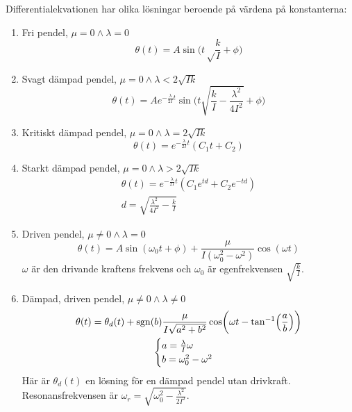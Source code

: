 \documentclass[12pt, a4paper]{article}
\DeclareMathOperator{\sgn}{sgn}
\begin{document}
Differentialekvationen har olika lösningar beroende på värdena på konstanterna:
\begin{enumerate}
    \item Fri pendel, $\mu=0\land\lambda=0$
    \begin{equation}\label{eq:fri_pendel}
        \theta(t)=A\sin\biggl(t\sqrt\frac{k}{I}+\phi\biggr)
    \end{equation}
    \item Svagt dämpad pendel, $\mu=0\land\lambda<2\sqrt{Ik}$
    \begin{equation}\label{eq:svagt_dämpad}
        \theta(t)=Ae^{-\frac{\lambda}{2I}t}\sin\biggl(t\sqrt{\frac{k}{I}-\frac{\lambda^2}{4I^2}}+\phi\biggr)
    \end{equation}
    \item Kritiskt dämpad pendel, $\mu=0\land\lambda=2\sqrt{Ik}$
    \begin{equation}
        \theta(t)=e^{-\frac{\lambda}{2I}t}\left(C_1t+C_2\right)
    \end{equation}
    \item Starkt dämpad pendel, $\mu=0\land\lambda>2\sqrt{Ik}$
    \begin{equation}\label{eq:starkt_dämpad}
        \begin{gathered}
            \theta(t)=e^{-\frac{\lambda}{2I}t}\left(C_1e^{td}+C_2e^{-td}\right)\\
            d=\sqrt{\frac{\lambda^2}{4I^2}-\frac{k}{I}}
        \end{gathered}
    \end{equation}
    \item Driven pendel, $\mu\neq0\land\lambda=0$
    \begin{equation}\label{eq:driven}
        \theta(t)=A\sin(\omega_0t+\phi)+\frac{\mu}{I(\omega_0^2-\omega^2)}\cos(\omega t)
    \end{equation}
    $\omega$ är den drivande kraftens frekvens och $\omega_0$ är egenfrekvensen $\sqrt{\frac{k}{I}}$.
    \item Dämpad, driven pendel, $\mu\neq0\land\lambda\neq0$
    \begin{equation}\label{eq:dämpad_driven}
        \begin{gathered}
            \theta(t)=\theta_d(t)+\sgn(b)\frac{\mu}{I\sqrt{a^2+b^2}}\cos\biggl(\omega t-\tan^{-1}\Bigl(\frac{a}{b}\Bigr)\biggr)\\
            \begin{cases}
                a=\frac{\lambda}{I}\omega\\
                b=\omega_0^2-\omega^2
            \end{cases}
        \end{gathered}        
    \end{equation}
    Här är $\theta_d(t)$ en lösning för en dämpad pendel utan drivkraft. Resonansfrekvensen är $\omega_r=\sqrt{\omega_0^2-\frac{\lambda^2}{2I^2}}$.
\end{enumerate}
\end{document}
